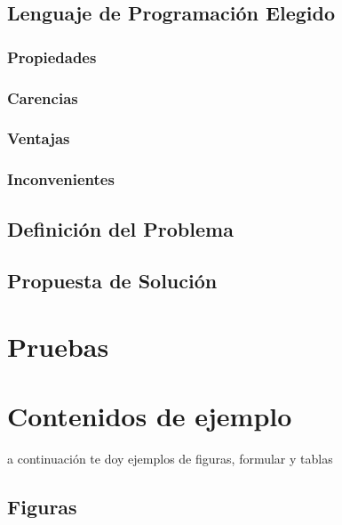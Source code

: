 \documentclass[letter,12pt]{report}
\begin{document}
\section{Lenguaje de Programación Elegido}
\blindtext %

\subsection{Propiedades}
\blindtext %

\subsection{Carencias}
\blindtext %

\subsection{Ventajas}
\blindtext %

\subsection{Inconvenientes}
\blindtext %

\section{Definición del Problema}
\blindtext %

\section{Propuesta de Solución}
\blindtext %


\chapter{Pruebas}
\blindtext %


\chapter{Contenidos de ejemplo}
a continuación te doy ejemplos de figuras, formular y tablas

\section{Figuras}
\end{document}

